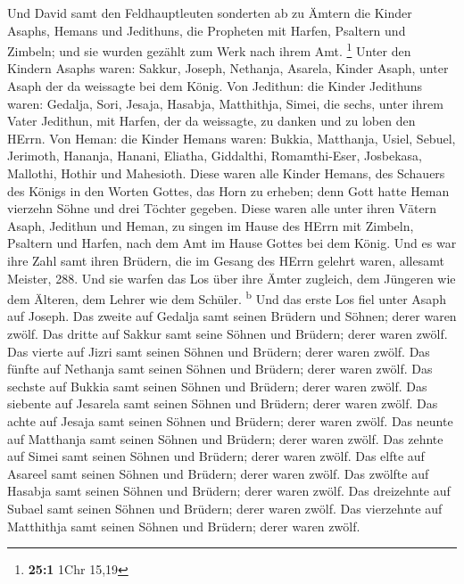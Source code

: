  Und David samt den Feldhauptleuten sonderten ab zu Ämtern
die Kinder Asaphs, Hemans und Jedithuns, die Propheten mit Harfen,
Psaltern und Zimbeln; und sie wurden gezählt zum Werk nach ihrem Amt.
\footnote{\textbf{25:1} 1Chr 15,19}  Unter den Kindern
Asaphs waren: Sakkur, Joseph, Nethanja, Asarela, Kinder Asaph, unter
Asaph der da weissagte bei dem König.  Von Jedithun: die
Kinder Jedithuns waren: Gedalja, Sori, Jesaja, Hasabja, Matthithja,
Simei, die sechs, unter ihrem Vater Jedithun, mit Harfen, der da
weissagte, zu danken und zu loben den HErrn.  Von Heman:
die Kinder Hemans waren: Bukkia, Matthanja, Usiel, Sebuel, Jerimoth,
Hananja, Hanani, Eliatha, Giddalthi, Romamthi-Eser, Josbekasa, Mallothi,
Hothir und Mahesioth.  Diese waren alle Kinder Hemans, des
Schauers des Königs in den Worten Gottes, das Horn zu erheben; denn Gott
hatte Heman vierzehn Söhne und drei Töchter gegeben. 
Diese waren alle unter ihren Vätern Asaph, Jedithun und Heman, zu singen
im Hause des HErrn mit Zimbeln, Psaltern und Harfen, nach dem Amt im
Hause Gottes bei dem König.  Und es war ihre Zahl samt
ihren Brüdern, die im Gesang des HErrn gelehrt waren, allesamt Meister,
288.  Und sie warfen das Los über ihre Ämter zugleich, dem
Jüngeren wie dem Älteren, dem Lehrer wie dem Schüler.
\textsuperscript{b}  Und das erste Los fiel unter Asaph
auf Joseph. Das zweite auf Gedalja samt seinen Brüdern und Söhnen; derer
waren zwölf.  Das dritte auf Sakkur samt seine Söhnen und
Brüdern; derer waren zwölf.  Das vierte auf Jizri samt
seinen Söhnen und Brüdern; derer waren zwölf.  Das fünfte
auf Nethanja samt seinen Söhnen und Brüdern; derer waren zwölf.
 Das sechste auf Bukkia samt seinen Söhnen und Brüdern;
derer waren zwölf.  Das siebente auf Jesarela samt seinen
Söhnen und Brüdern; derer waren zwölf.  Das achte auf
Jesaja samt seinen Söhnen und Brüdern; derer waren zwölf.
 Das neunte auf Matthanja samt seinen Söhnen und Brüdern;
derer waren zwölf.  Das zehnte auf Simei samt seinen
Söhnen und Brüdern; derer waren zwölf.  Das elfte auf
Asareel samt seinen Söhnen und Brüdern; derer waren zwölf.
 Das zwölfte auf Hasabja samt seinen Söhnen und Brüdern;
derer waren zwölf.  Das dreizehnte auf Subael samt seinen
Söhnen und Brüdern; derer waren zwölf.  Das vierzehnte
auf Matthithja samt seinen Söhnen und Brüdern; derer waren zwölf.
